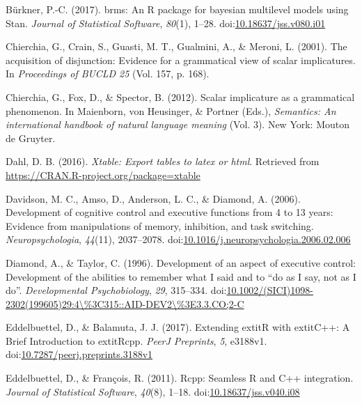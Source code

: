 \documentclass[man]{apa6}
\begin{document}
\hypertarget{ref-R-brms}{}
Bürkner, P.-C. (2017). brms: An R package for bayesian multilevel models
using Stan. \emph{Journal of Statistical Software}, \emph{80}(1), 1--28.
doi:\href{https://doi.org/10.18637/jss.v080.i01}{10.18637/jss.v080.i01}

\hypertarget{ref-chierchia2001}{}
Chierchia, G., Crain, S., Guasti, M. T., Gualmini, A., \& Meroni, L.
(2001). The acquisition of disjunction: Evidence for a grammatical view
of scalar implicatures. In \emph{Proceedings of BUCLD 25} (Vol. 157, p.
168).

\hypertarget{ref-chierchia2012}{}
Chierchia, G., Fox, D., \& Spector, B. (2012). Scalar implicature as a
grammatical phenomenon. In Maienborn, von Heusinger, \& Portner (Eds.),
\emph{Semantics: An international handbook of natural language meaning}
(Vol. 3). New York: Mouton de Gruyter.

\hypertarget{ref-R-xtable}{}
Dahl, D. B. (2016). \emph{Xtable: Export tables to latex or html}.
Retrieved from \url{https://CRAN.R-project.org/package=xtable}

\hypertarget{ref-davidson2006}{}
Davidson, M. C., Amso, D., Anderson, L. C., \& Diamond, A. (2006).
Development of cognitive control and executive functions from 4 to 13
years: Evidence from manipulations of memory, inhibition, and task
switching. \emph{Neuropsychologia}, \emph{44}(11), 2037--2078.
doi:\href{https://doi.org/10.1016/j.neuropsychologia.2006.02.006}{10.1016/j.neuropsychologia.2006.02.006}

\hypertarget{ref-diamond1996}{}
Diamond, A., \& Taylor, C. (1996). Development of an aspect of executive
control: Development of the abilities to remember what I said and to
``do as I say, not as I do''. \emph{Developmental Psychobiology},
\emph{29}, 315--334.
doi:\href{https://doi.org/10.1002/(SICI)1098-2302(199605)29:4/\%3C315::AID-DEV2/\%3E3.3.CO;2-C}{10.1002/(SICI)1098-2302(199605)29:4\textbackslash{}\%3C315::AID-DEV2\textbackslash{}\%3E3.3.CO;2-C}

\hypertarget{ref-R-Rcpp_b}{}
Eddelbuettel, D., \& Balamuta, J. J. (2017). Extending extitR with
extitC++: A Brief Introduction to extitRcpp. \emph{PeerJ Preprints},
\emph{5}, e3188v1.
doi:\href{https://doi.org/10.7287/peerj.preprints.3188v1}{10.7287/peerj.preprints.3188v1}

\hypertarget{ref-R-Rcpp_a}{}
Eddelbuettel, D., \& François, R. (2011). Rcpp: Seamless R and C++
integration. \emph{Journal of Statistical Software}, \emph{40}(8),
1--18.
doi:\href{https://doi.org/10.18637/jss.v040.i08}{10.18637/jss.v040.i08}
\end{document}
